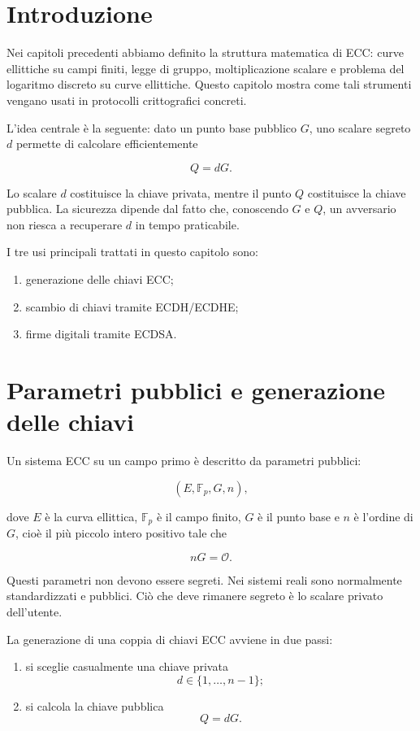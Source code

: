 \documentclass[12pt,a4paper,oneside]{report}
\begin{document}
\section{Introduzione}

Nei capitoli precedenti abbiamo definito la struttura matematica di ECC: curve ellittiche su campi finiti, legge di gruppo, moltiplicazione scalare e problema del logaritmo discreto su curve ellittiche. Questo capitolo mostra come tali strumenti vengano usati in protocolli crittografici concreti.

L'idea centrale è la seguente: dato un punto base pubblico \(G\), uno scalare segreto \(d\) permette di calcolare efficientemente

\[
Q=dG.
\]

Lo scalare \(d\) costituisce la chiave privata, mentre il punto \(Q\) costituisce la chiave pubblica. La sicurezza dipende dal fatto che, conoscendo \(G\) e \(Q\), un avversario non riesca a recuperare \(d\) in tempo praticabile.

I tre usi principali trattati in questo capitolo sono:

\begin{enumerate}
    \item generazione delle chiavi ECC;
    \item scambio di chiavi tramite ECDH/ECDHE;
    \item firme digitali tramite ECDSA.
\end{enumerate}

\section{Parametri pubblici e generazione delle chiavi}

Un sistema ECC su un campo primo è descritto da parametri pubblici:

\[
(E,\mathbb{F}_p,G,n),
\]

dove \(E\) è la curva ellittica, \(\mathbb{F}_p\) è il campo finito, \(G\) è il punto base e \(n\) è l'ordine di \(G\), cioè il più piccolo intero positivo tale che

\[
nG=\mathcal{O}.
\]

Questi parametri non devono essere segreti. Nei sistemi reali sono normalmente standardizzati e pubblici. Ciò che deve rimanere segreto è lo scalare privato dell'utente.

La generazione di una coppia di chiavi ECC avviene in due passi:

\begin{enumerate}
    \item si sceglie casualmente una chiave privata
    \[
    d \in \{1,\ldots,n-1\};
    \]
    \item si calcola la chiave pubblica
    \[
    Q=dG.
    \]
\end{enumerate}
\end{document}

